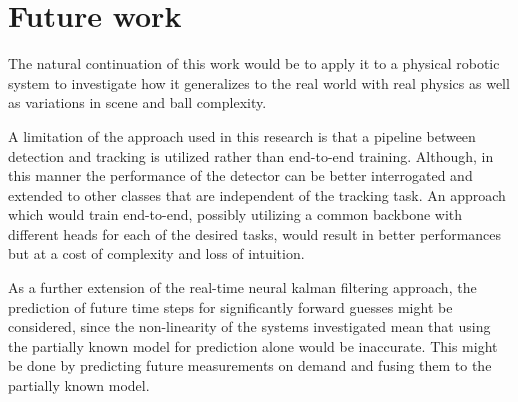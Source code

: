\documentclass[a4paper,twoside,12pt]{report}
\begin{document}
\section{Future work}

The natural continuation of this work would be to apply it to a physical robotic system to investigate how it generalizes to the real world with real physics as well as variations in scene and ball complexity.

A limitation of the approach used in this research is that a pipeline between detection and tracking is utilized rather than end-to-end training. Although, in this manner the performance of the detector can be better interrogated and extended to other classes that are independent of the tracking task. An approach which would train end-to-end, possibly utilizing a common backbone with different heads for each of the desired tasks, would result in better performances but at a cost of complexity and loss of intuition.

As a further extension of the real-time neural kalman filtering approach, the prediction of future time steps for significantly forward guesses might be considered, since the non-linearity of the systems investigated mean that using the partially known model for prediction alone would be inaccurate. This might be done by predicting future measurements on demand and fusing them to the partially known model.

%



\end{document}
